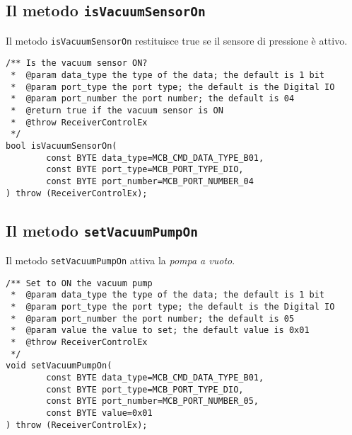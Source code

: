 \subsection{Il metodo \texttt{isVacuumSensorOn}}
Il metodo \texttt{isVacuumSensorOn} restituisce true se il sensore di pressione
\`e attivo.
\lstset{language=C++}
\begin{lstlisting}[caption={Dichiarazione del metodo \texttt{isVacuumSensorOn}},
label=lst:isVacuumSensorOn,mathescape]
/** Is the vacuum sensor ON?
 *  @param data_type the type of the data; the default is 1 bit
 *  @param port_type the port type; the default is the Digital IO
 *  @param port_number the port number; the default is 04
 *  @return true if the vacuum sensor is ON 
 *  @throw ReceiverControlEx
 */
bool isVacuumSensorOn(
        const BYTE data_type=MCB_CMD_DATA_TYPE_B01,
        const BYTE port_type=MCB_PORT_TYPE_DIO,
        const BYTE port_number=MCB_PORT_NUMBER_04
) throw (ReceiverControlEx);
\end{lstlisting}
\lstset{numbers=none}


\subsection{Il metodo \texttt{setVacuumPumpOn}}
Il metodo \texttt{setVacuumPumpOn} attiva la \emph{pompa a vuoto}.
\lstset{language=C++}
\begin{lstlisting}[caption={Dichiarazione del metodo \texttt{setVacuumPumpOn}},
label=lst:setVacuumPumpOn,mathescape]
/** Set to ON the vacuum pump
 *  @param data_type the type of the data; the default is 1 bit
 *  @param port_type the port type; the default is the Digital IO
 *  @param port_number the port number; the default is 05
 *  @param value the value to set; the default value is 0x01
 *  @throw ReceiverControlEx
 */
void setVacuumPumpOn(
        const BYTE data_type=MCB_CMD_DATA_TYPE_B01,
        const BYTE port_type=MCB_PORT_TYPE_DIO,
        const BYTE port_number=MCB_PORT_NUMBER_05,
        const BYTE value=0x01
) throw (ReceiverControlEx);
\end{lstlisting}
\lstset{numbers=none}


